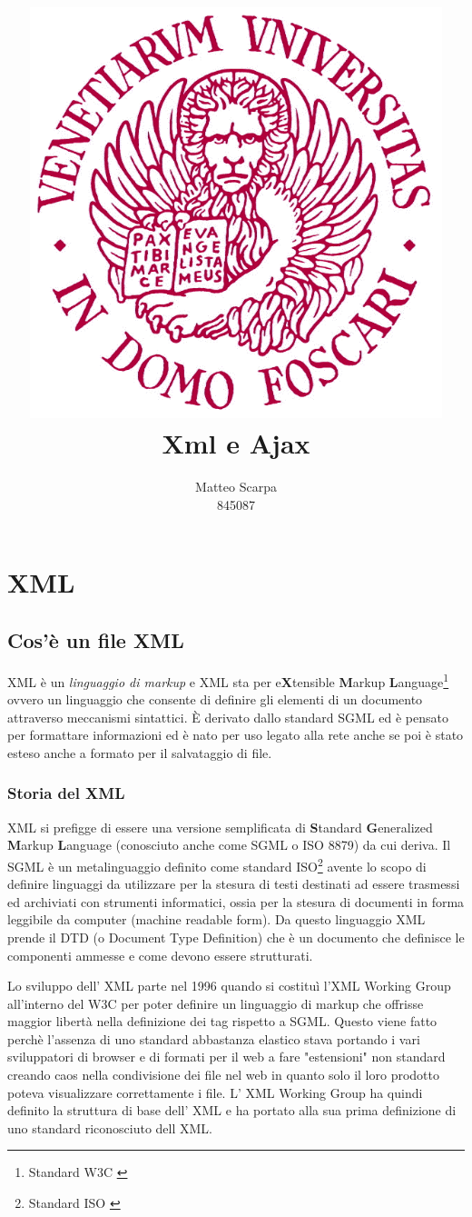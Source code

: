 \documentclass{article}
\title{\includegraphics[width=120mm]{logo-unive.png} \\ Xml e Ajax}
\author{Matteo Scarpa\\ 845087}
\date{}
\begin{document}
\maketitle
\newpage
\tableofcontents

\section{XML}
\subsection{Cos'è un file XML}
XML è un \textit{linguaggio di markup} e XML sta per e\textbf{X}tensible \textbf{M}arkup \textbf{L}anguage\footnote{Standard W3C \cite{site:w3cxml}} ovvero un linguaggio che consente di definire gli elementi di un documento attraverso meccanismi sintattici.
È derivato dallo standard SGML  ed è pensato per formattare informazioni ed è nato per uso legato alla rete anche se poi è stato esteso anche a formato per il salvataggio di file.

\subsubsection{Storia del XML}
XML si prefigge di essere una versione semplificata di \textbf{S}tandard \textbf{G}eneralized \textbf{M}arkup \textbf{L}anguage (conosciuto anche come SGML o ISO 8879) da cui deriva.
Il SGML è un metalinguaggio definito come standard ISO\footnote{Standard ISO \cite{site:isosgml}}  avente lo scopo di definire linguaggi da utilizzare per la stesura di testi destinati ad essere trasmessi ed archiviati con strumenti informatici, ossia per la stesura di documenti in forma leggibile da computer (machine readable form). Da questo linguaggio XML prende il DTD (o Document Type Definition) che è un documento che definisce le componenti ammesse e come devono essere strutturati.

Lo sviluppo dell' XML parte nel 1996 quando si costituì l’XML Working Group all'interno del W3C per poter definire un linguaggio di markup che offrisse maggior libertà nella definizione dei tag rispetto a SGML. Questo viene fatto perchè l'assenza di uno standard abbastanza elastico stava portando i vari sviluppatori di browser e di formati per il web a fare "estensioni" non standard creando caos nella condivisione dei file nel web in quanto solo il loro prodotto poteva visualizzare correttamente i file.
L' XML Working Group ha quindi definito la struttura di base dell' XML e ha portato alla sua prima definizione di uno standard riconosciuto dell XML. 
\end{document}
